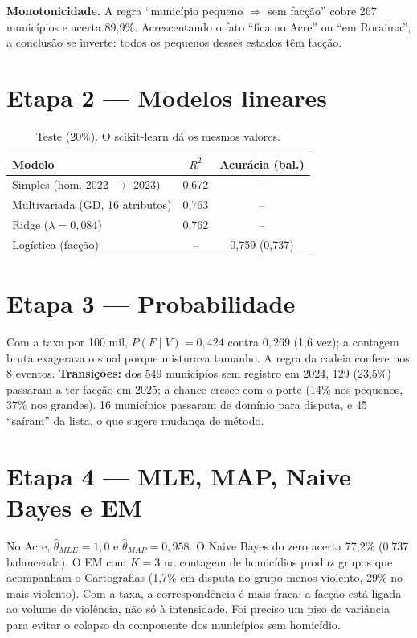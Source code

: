 \documentclass[10pt,a4paper,twocolumn]{article}
\begin{document}
\textbf{Monotonicidade.} A regra ``município pequeno $\Rightarrow$ sem facção'' cobre 267
municípios e acerta 89,9\%. Acrescentando o fato ``fica no Acre'' ou ``em Roraima'', a conclusão
se inverte: todos os pequenos desses estados têm facção.

\section{Etapa 2 — Modelos lineares}
\begin{table}[h]\centering\small
\begin{tabular}{lcc}\toprule
Modelo & $R^2$ & Acurácia (bal.)\\\midrule
Simples (hom. 2022 $\to$ 2023) & 0,672 & --\\
Multivariada (GD, 16 atributos) & 0,763 & --\\
Ridge ($\lambda=0{,}084$) & 0,762 & --\\
Logística (facção) & -- & 0,759 (0,737)\\\bottomrule
\end{tabular}\caption{Teste (20\%). O scikit-learn dá os mesmos valores.}\end{table}

\section{Etapa 3 — Probabilidade}
Com a taxa por 100 mil, $P(F\mid V)=0{,}424$ contra $0{,}269$ (1,6 vez); a contagem bruta exagerava
o sinal porque misturava tamanho. A regra da cadeia confere nos 8 eventos.
\textbf{Transições:} dos 549 municípios sem registro em 2024, 129 (23,5\%) passaram a ter facção
em 2025; a chance cresce com o porte (14\% nos pequenos, 37\% nos grandes). 16 municípios
passaram de domínio para disputa, e 45 ``saíram'' da lista, o que sugere mudança de método.

\section{Etapa 4 — MLE, MAP, Naive Bayes e EM}
No Acre, $\hat\theta_{MLE}=1{,}0$ e $\hat\theta_{MAP}=0{,}958$. O Naive Bayes do zero acerta
77,2\% (0,737 balanceada). O EM com $K=3$ na contagem de homicídios produz grupos que acompanham
o Cartografias (1,7\% em disputa no grupo menos violento, 29\% no mais violento). Com a taxa, a
correspondência é mais fraca: a facção está ligada ao volume de violência, não só à intensidade.
Foi preciso um piso de variância para evitar o colapso da componente dos municípios sem homicídio.
\end{document}
